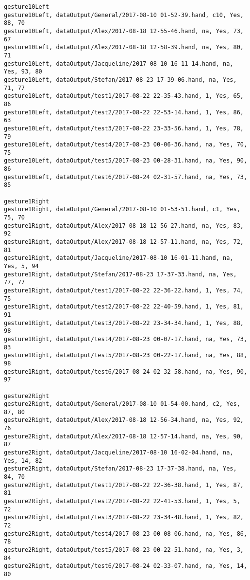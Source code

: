 \begin{verbatim}
gesture10Left
gesture10Left, dataOutput/General/2017-08-10 01-52-39.hand, c10, Yes, 88, 70
gesture10Left, dataOutput/Alex/2017-08-18 12-55-46.hand, na, Yes, 73, 67
gesture10Left, dataOutput/Alex/2017-08-18 12-58-39.hand, na, Yes, 80, 71
gesture10Left, dataOutput/Jacqueline/2017-08-10 16-11-14.hand, na, Yes, 93, 80
gesture10Left, dataOutput/Stefan/2017-08-23 17-39-06.hand, na, Yes, 71, 77
gesture10Left, dataOutput/test1/2017-08-22 22-35-43.hand, 1, Yes, 65, 86
gesture10Left, dataOutput/test2/2017-08-22 22-53-14.hand, 1, Yes, 86, 63
gesture10Left, dataOutput/test3/2017-08-22 23-33-56.hand, 1, Yes, 78, 79
gesture10Left, dataOutput/test4/2017-08-23 00-06-36.hand, na, Yes, 70, 75
gesture10Left, dataOutput/test5/2017-08-23 00-28-31.hand, na, Yes, 90, 86
gesture10Left, dataOutput/test6/2017-08-24 02-31-57.hand, na, Yes, 73, 85

gesture1Right
gesture1Right, dataOutput/General/2017-08-10 01-53-51.hand, c1, Yes, 75, 70
gesture1Right, dataOutput/Alex/2017-08-18 12-56-27.hand, na, Yes, 83, 92
gesture1Right, dataOutput/Alex/2017-08-18 12-57-11.hand, na, Yes, 72, 81
gesture1Right, dataOutput/Jacqueline/2017-08-10 16-01-11.hand, na, Yes, 5, 94
gesture1Right, dataOutput/Stefan/2017-08-23 17-37-33.hand, na, Yes, 77, 77
gesture1Right, dataOutput/test1/2017-08-22 22-36-22.hand, 1, Yes, 74, 75
gesture1Right, dataOutput/test2/2017-08-22 22-40-59.hand, 1, Yes, 81, 91
gesture1Right, dataOutput/test3/2017-08-22 23-34-34.hand, 1, Yes, 88, 98
gesture1Right, dataOutput/test4/2017-08-23 00-07-17.hand, na, Yes, 73, 83
gesture1Right, dataOutput/test5/2017-08-23 00-22-17.hand, na, Yes, 88, 98
gesture1Right, dataOutput/test6/2017-08-24 02-32-58.hand, na, Yes, 90, 97

gesture2Right
gesture2Right, dataOutput/General/2017-08-10 01-54-00.hand, c2, Yes, 87, 80
gesture2Right, dataOutput/Alex/2017-08-18 12-56-34.hand, na, Yes, 92, 76
gesture2Right, dataOutput/Alex/2017-08-18 12-57-14.hand, na, Yes, 90, 87
gesture2Right, dataOutput/Jacqueline/2017-08-10 16-02-04.hand, na, Yes, 14, 82
gesture2Right, dataOutput/Stefan/2017-08-23 17-37-38.hand, na, Yes, 84, 70
gesture2Right, dataOutput/test1/2017-08-22 22-36-38.hand, 1, Yes, 87, 81
gesture2Right, dataOutput/test2/2017-08-22 22-41-53.hand, 1, Yes, 5, 72
gesture2Right, dataOutput/test3/2017-08-22 23-34-48.hand, 1, Yes, 82, 72
gesture2Right, dataOutput/test4/2017-08-23 00-08-06.hand, na, Yes, 86, 78
gesture2Right, dataOutput/test5/2017-08-23 00-22-51.hand, na, Yes, 3, 84
gesture2Right, dataOutput/test6/2017-08-24 02-33-07.hand, na, Yes, 14, 80


\end{verbatim}

